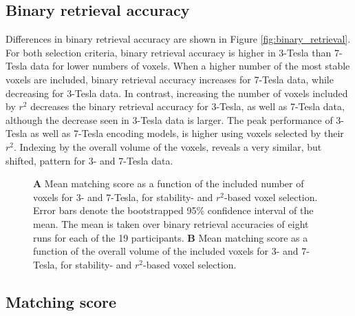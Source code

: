 \subsection*{Binary retrieval accuracy}

Differences in binary retrieval accuracy are shown in Figure \ref{fig:binary_retrieval}. For both selection criteria, binary retrieval
accuracy is higher in 3-Tesla than 7-Tesla data for lower numbers of voxels.
When a higher number of the most stable voxels are included, binary retrieval accuracy increases for 7-Tesla data, while decreasing for 3-Tesla data.    
In contrast, increasing the number of voxels included by $r^2$ decreases the
binary retrieval accuracy for 3-Tesla, as well as 7-Tesla data, although the
decrease seen in 3-Tesla data is larger. The peak
performance of 3-Tesla as well as 7-Tesla encoding models, is higher using
voxels selected by their $r^2$.
Indexing by the overall volume of the voxels, reveals a very similar, but
shifted, pattern for 3- and 7-Tesla data.

\begin{figure}
  \centering
  \def\svgwidth{\linewidth}
  
	
  \caption{\textbf{A} Mean matching score as a function of the included number of
  voxels for 3- and 7-Tesla, for stability- and $r^2$-based voxel selection. Error bars denote the bootstrapped 95\% confidence
  interval of the mean. The mean is taken over binary retrieval accuracies of
  eight runs for each of the 19 participants. \textbf{B} Mean matching score as a function of the overall volume of
	  the included voxels for 3- and 7-Tesla, for stability- and $r^2$-based voxel selection.}

 \label{fig:matching_score}
\end{figure}

\subsection*{Matching score}

